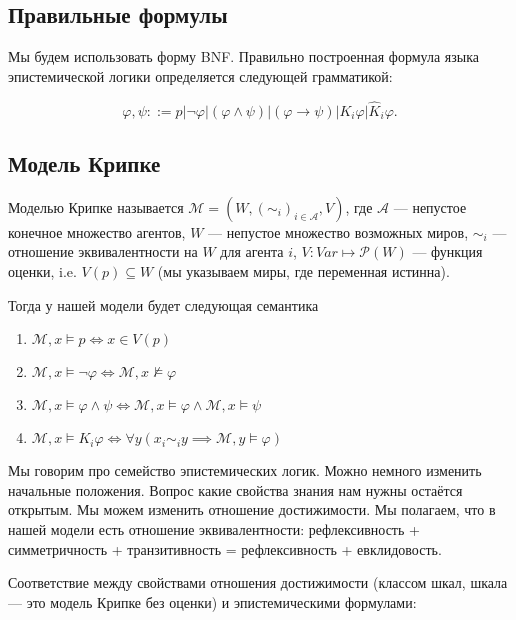 \documentclass[openany]{book}
\theoremstyle{plain}
\theoremstyle{definition}
\begin{document}
\subsection{Правильные формулы}

Мы будем использовать форму BNF. Правильно построенная формула языка эпистемической логики определяется следующей грамматикой:

\[\varphi, \psi ::= p | \neg \varphi | (\varphi \land \psi) | (\varphi \to \psi) | K_i\varphi | \hat{K}_i \varphi.\]

\subsection{Модель Крипке}

Моделью Крипке называется \(\mathcal{M} = (W, (\sim_i)_{i\in \mathcal{A}}, V)\), где
\(\mathcal{A}\) — непустое конечное множество агентов, \(W\) — непустое множество возможных миров, \(\sim_i\) — отношение эквивалентности на \(W\) для агента \(i\), \(V : Var \mapsto \mathcal{P}(W)\) — функция оценки, i.e. \(V(p) \subseteq W\) (мы указываем миры, где переменная истинна).

Тогда у нашей модели будет следующая семантика
\begin{enumerate}
    \item\(\mathcal{M}, x \models p \Leftrightarrow x \in V(p)\) 
    \item\(\mathcal{M}, x \models \neg \varphi \Leftrightarrow \mathcal{M}, x \not\models \varphi\) 
    \item\(\mathcal{M}, x \models \varphi \land \psi \Leftrightarrow \mathcal{M}, x \models \varphi \land \mathcal{M}, x \models \psi\)
    \item\(\mathcal{M}, x \models K_i \varphi \Leftrightarrow \forall y(x_i \sim_i y \implies \mathcal{M}, y \models \varphi)\)
\end{enumerate}

Мы говорим про семейство эпистемических логик. Можно немного изменить начальные положения.
Вопрос какие свойства знания нам нужны остаётся открытым. Мы можем изменить отношение достижимости. Мы полагаем, что в нашей модели есть отношение эквивалентности: рефлексивность + симметричность + транзитивность = рефлексивность + евклидовость.


Соответствие между свойствами отношения достижимости (классом шкал, шкала — это модель Крипке без оценки) и эпистемическими формулами:
\end{document}
